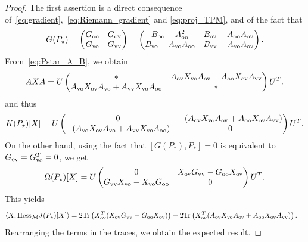\documentclass{article}
\newcommand{\tr}{{\rm Tr}}
\newcommand{\1}{{\mathds 1}}
\begin{document}
\begin{proof} The first assertion is a direct consequence of~\eqref{eq:gradient},~\eqref{eq:Riemann_gradient} and \eqref{eq:proj_TPM}, and of the fact that
\begin{align*}
    G(P_\star) = \begin{pmatrix} G_{\rm oo}  & G_{\rm ov} \\ G_{\rm vo}  & G_{\rm vv} \end{pmatrix} = \begin{pmatrix} B_{\rm oo} - A_{\rm oo}^2 & B_{\rm ov}-A_{\rm oo}A_{\rm ov} \\ B_{\rm vo} - A_{\rm vo}A_{\rm oo} & B_{\rm vv}-A_{\rm vo}A_{\rm ov} \end{pmatrix}.
\end{align*}
From~\eqref{eq:Pstar_A_B}, we obtain
$$
AXA =  U \begin{pmatrix}
        * &  A_{\rm ov}X_{\rm vo}A_{\rm ov} + A_{\rm oo} X_{\rm ov} A_{\rm vv} \\  A_{\rm vo}X_{\rm ov}A_{\rm vo} + A_{\rm vv} X_{\rm vo} A_{\rm oo} & *  \end{pmatrix} U^T.
$$
and thus 
\begin{align*}
    K(P_\star)[X] = U \begin{pmatrix}
        0 &  -(A_{\rm ov}X_{\rm vo}A_{\rm ov} + A_{\rm oo} X_{\rm ov} A_{\rm vv}) \\  -(A_{\rm vo}X_{\rm ov}A_{\rm vo} + A_{\rm vv} X_{\rm vo} A_{\rm oo}) & 0  \end{pmatrix} U^T.
\end{align*}
On the other hand, using the fact that $[G(P_*),P_*]=0$ is equivalent to $G_{\rm ov}=G_{\rm vo}^T=0$, we get
\begin{align*}
    \Omega(P_\star)[X] = U \begin{pmatrix}
     0   & X_{\rm ov} G_{\rm vv} - G_{\rm oo} X_{\rm ov} \\  G_{\rm vv} X_{\rm vo}  - X_{\rm vo}G_{\rm oo}  & 0  
    \end{pmatrix} U^T.
\end{align*}
This yields
\begin{align*}
  \langle X, \mbox{\rm Hess}_{\mathcal{M}} J(P_\star)[X] \rangle & = 2 \tr\left(X_{\rm ov}^T  (X_{\rm ov} G_{\rm vv} - G_{\rm oo} X_{\rm ov} )\right) - 2 \tr \left( X_{\rm ov}^T  (A_{\rm ov}X_{\rm vo}A_{\rm ov} + A_{\rm oo} X_{\rm ov} A_{\rm vv}) \right).
\end{align*}
Rearranging the terms in the traces, we obtain the expected result.
\end{proof}
\end{document}
